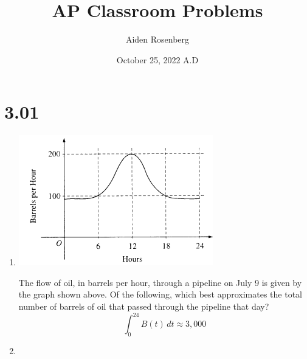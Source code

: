 \documentclass[12pt]{article}
\title{AP Classroom Problems}
\author{Aiden Rosenberg}
\date{October 25, 2022 A.D }
\begin{document}
\maketitle
\section*{3.01}
\begin{enumerate}
    \item 
    \begin{center}
        \includegraphics[]{original-7.png}
    \end{center}
    The flow of oil, in barrels per hour, through a pipeline on July 9 is given by the graph shown above. Of the following, which best approximates the total number of barrels of oil that passed through the pipeline that day?
$$\boxed{\int_{0}^{24} B(t) \, dt \approx 3,000}$$
\item 


\end{enumerate}
\end{document}
